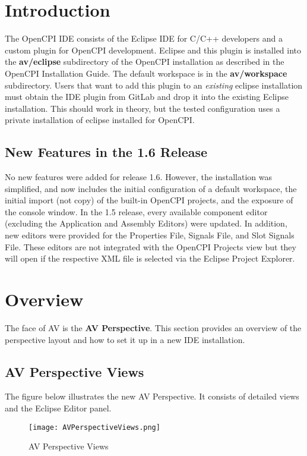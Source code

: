 \section{Introduction}
The OpenCPI {IDE} consists of the Eclipse IDE for C/C++ developers and a custom plugin for OpenCPI development. Eclipse and this plugin is installed into the \textbf{av/eclipse} subdirectory of the OpenCPI installation as described in the OpenCPI Installation Guide.  The default workspace is in the \textbf{av/workspace} subdirectory.  Users that want to add this plugin to an \textit{existing} eclipse installation must obtain the IDE plugin from GitLab and drop it into the existing Eclipse installation.  This should work in theory, but the tested configuration uses a private installation of eclipse installed for OpenCPI.
\subsection{New Features in the 1.6 Release}
No new features were added for release 1.6. However, the installation was simplified, and now includes the initial configuration of a default workspace, the initial import (not copy) of the built-in OpenCPI projects, and the exposure of the console window.
In the 1.5 release, every available component editor (excluding the Application and Assembly Editors) were updated. In addition, new editors were provided for the Properties File, Signals File, and Slot Signals File. These editors are not integrated with the OpenCPI Projects view but they will open if the respective XML file is selected via the Eclipse Project Explorer.

\newpage
\section{Overview}
The face of AV is the \textbf{AV Perspective}. This section provides an overview of the perspective layout and how to set it up in a new IDE installation.
\subsection{AV Perspective Views}
The figure below illustrates the new AV Perspective. It consists of detailed views and the Eclipse Editor panel.

\begin{figure}[h!]
	\centering
	\caption{AV Perspective Views}\label{fig:AVPerspectiveViews}
	\texttt{[image: AVPerspectiveViews.png]}
\end{figure}


